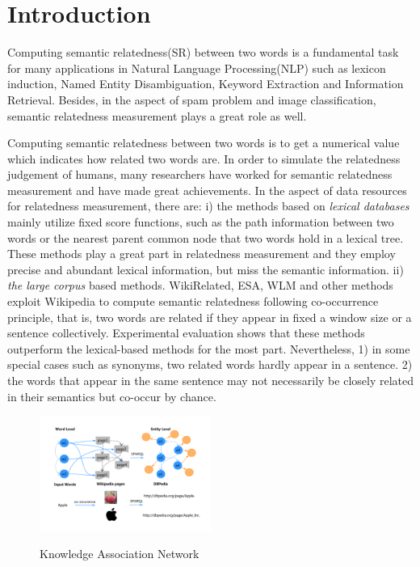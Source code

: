 \section{Introduction}
Computing semantic relatedness(SR) between two words is a fundamental task for many applications in Natural Language
Processing(NLP) such as lexicon induction\cite{aaai/QadirMGL15}, Named Entity Disambiguation\cite{acl/HanZ10}, Keyword Extraction
\cite{ijcai/ZhangFW13} and Information Retrieval\cite{acl/GurevychMZ07}. Besides, in the aspect of spam problem\cite{www/SandulescuE15}
and image classification\cite{iwcs/LeongM11}, semantic relatedness measurement plays a great role as well.

Computing semantic relatedness between two words is to get a numerical value which indicates how related two words are.
In order to simulate the relatedness judgement of humans, many researchers have worked for semantic relatedness measurement and
have made great achievements. In the aspect of data resources for relatedness measurement, there are:
i) the methods based on \emph{lexical databases}\cite{acl/Pucher07,aaai/ZeschMG08,tkde/ZhuI17} mainly utilize fixed score functions, such as
the path information between two words or the nearest parent common node that two words hold in a lexical tree. These methods play a great part in
relatedness measurement and they employ precise and abundant lexical information, but miss the semantic information.
ii) \emph{the large corpus} based methods. WikiRelated\cite{aaai/StrubeP06}, ESA\cite{ijcai/GabrilovichM07}, WLM\cite{aaai/ZeschMG08}
and other methods exploit Wikipedia to compute semantic relatedness following co-occurrence principle, that is, two words
are related if they appear in fixed a window size or a sentence collectively. Experimental evaluation shows that these methods
outperform the lexical-based methods for the most part. Nevertheless, 1) in some special cases such as synonyms, two related words
hardly appear in a sentence. 2) the words that appear in the same sentence may not necessarily be closely related in their semantics
but co-occur by chance\cite{aaai/GongXH18}.

\begin{figure}
    \flushleft
    \includegraphics[width=0.5\textwidth]{pic/network.pdf}\\
    \caption{Knowledge Association Network}
    \label{network}
\end{figure}

